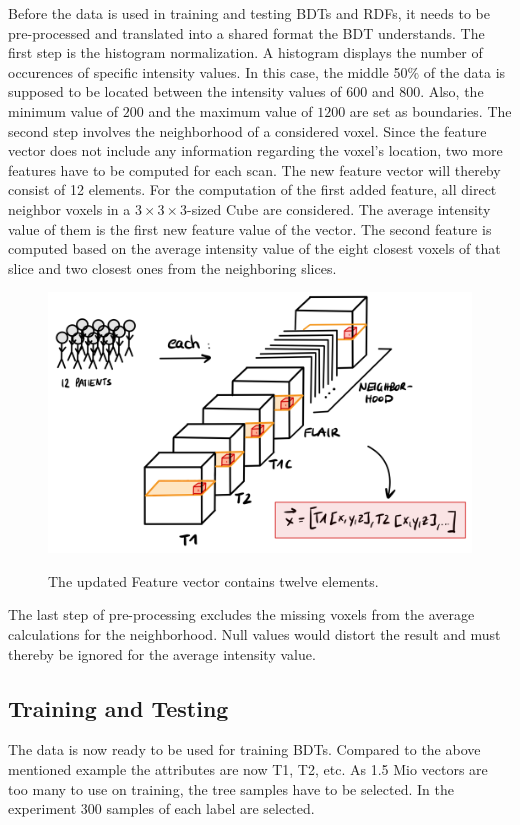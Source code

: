 \documentclass[
12pt,
headsepline,
bibliography=totoc,
twoside=semi,
fleqn
]{scrartcl}
\begin{document}
 Before the data is used in training and testing BDTs and RDFs, it needs to be pre-processed and translated into a shared format the BDT understands. The first step is the histogram normalization. A histogram displays the number of occurences of specific intensity values. In this case, the middle 50$\%$ of the data is supposed to be located between the intensity values of $600$ and $800$. Also, the minimum value of $200$ and the maximum value of $1200$ are set as boundaries. The second step involves the neighborhood of a considered voxel. Since the feature vector does not include any information regarding the voxel's location, two more features have to be computed for each scan. The new feature vector will thereby consist of 12 elements. For the computation of the first added feature, all direct neighbor voxels in a $3 \times 3 \times 3$-sized Cube are considered. The average intensity value of them is the first new feature value of the vector. The second feature is computed based on the average intensity value of the eight closest voxels of that slice and two closest ones from the neighboring slices. 

 \begin{figure}[H]
 \centering \includegraphics[scale=0.5]{BDT15.png}\label{fig:fig15}
 \caption{The updated Feature vector contains twelve elements.}
 \end{figure}



 The last step of pre-processing excludes the missing voxels from the average calculations for the neighborhood. Null values would distort the result and must thereby be ignored for the average intensity value. 

 \subsection{Training and Testing\label{sec:sec3-3}}
 The data is now ready to be used for training BDTs. Compared to the above mentioned example the attributes are now T1, T2, etc. As 1.5 Mio vectors are too many to use on training, the tree samples have to be selected. In the experiment 300 samples of each label are selected.
 
\end{document}
